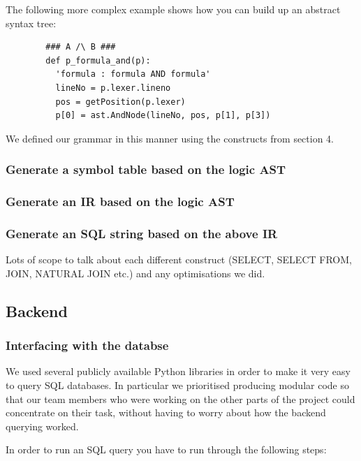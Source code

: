 \documentclass[a4paper, 11pt]{article}
\begin{document}
      The following more complex example shows how you can build up an abstract
      syntax tree:

      \begin{verbatim}
        ### A /\ B ###
        def p_formula_and(p):
          'formula : formula AND formula'
          lineNo = p.lexer.lineno
          pos = getPosition(p.lexer)
          p[0] = ast.AndNode(lineNo, pos, p[1], p[3])
       \end{verbatim}

       We defined our grammar in this manner using the constructs from section 4.


    \subsubsection{Generate a symbol table based on the logic AST}


    \subsubsection{Generate an IR based on the logic AST}

    \subsubsection{Generate an SQL string based on the above IR}
      Lots of scope to talk about each different construct (SELECT, SELECT FROM, JOIN, NATURAL JOIN etc.) and any optimisations we did.

    \subsection{Backend}
     \subsubsection{Interfacing with the databse}

      We used several publicly available Python libraries in order to make 
      it very easy to query SQL databases. In particular we prioritised
      producing modular code so that our team members who were working on the
      other parts of the project could concentrate on their task, without having
      to worry about how the backend querying worked.

      In order to run an SQL query you have to run through the following steps:
\end{document}
